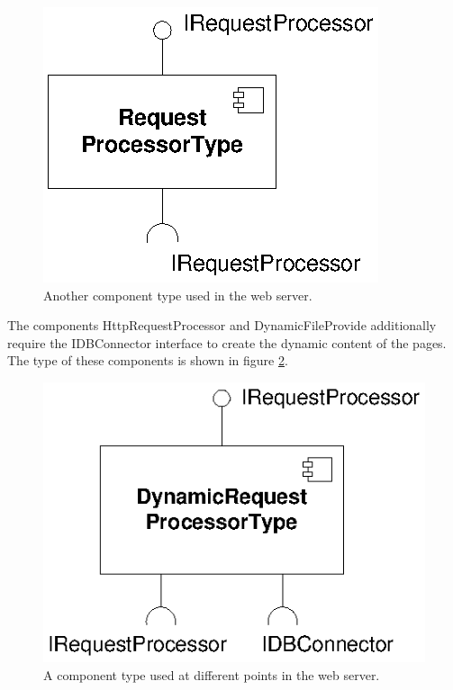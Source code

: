 \begin{figure}[htbp]
\centering
\includegraphics[scale=1.0]{example/RequestProcessorType}
\caption{Another component type used in the web server.}
\label{fig:RequestProcessorType}
\end{figure}

The components HttpRequestProcessor and DynamicFileProvide additionally require the IDBConnector interface to create the dynamic content of the pages. The type of these components is shown in figure \ref{fig:DynamicRequestProcessorType}.

\begin{figure}[htbp]
\centering
\includegraphics[scale=1.0]{example/DynamicRequestProcessorType}
\caption{A component type used at different points in the web server.}
\label{fig:DynamicRequestProcessorType}
\end{figure}

